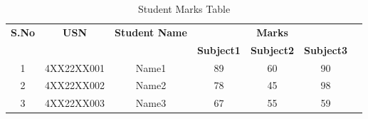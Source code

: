 \documentclass{article}
\begin{document}
\begin{table}[h]
\centering
\begin{tabular}{|c|c|c|c|c|c|c|}
\hline
\textbf{S.No} & \textbf{USN} & \textbf{Student Name} & \multicolumn{3}{c|}{\textbf{Marks}} \\ \cline{4-6}
              &              &                       & \textbf{Subject1} & \textbf{Subject2} & \textbf{Subject3} \\ \hline
1             & 4XX22XX001   & Name1                 & 89                & 60                & 90                \\ \hline
2             & 4XX22XX002   & Name2                 & 78                & 45                & 98                \\ \hline
3             & 4XX22XX003   & Name3                 & 67                & 55                & 59                \\ \hline
\end{tabular}
\caption{Student Marks Table}
\end{table}
\end{document}
